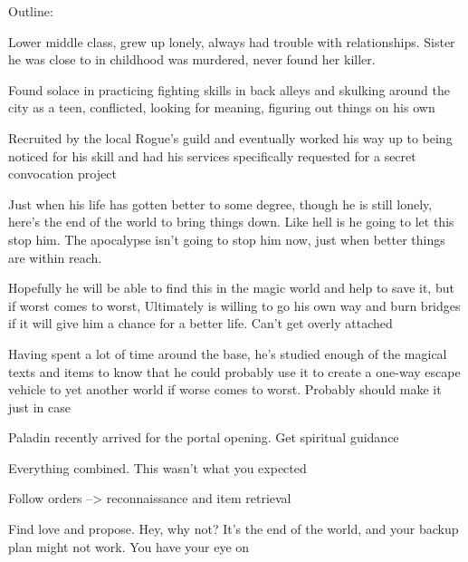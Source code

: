 \documentclass[char]{guildcamp3}
\begin{document}
\name{\cRogueOne{}}

\updatemacro{\cNPC}{
  \unknownplayer %
  }




Outline:

Lower middle class, grew up lonely, always had trouble with relationships. Sister he was close to in childhood was murdered, never found her killer.

Found solace in practicing fighting skills in back alleys and skulking around the city as a teen, conflicted, looking for meaning, figuring out things on his own

Recruited by the local Rogue's guild and eventually worked his way up to being noticed for his skill and had his services specifically requested for a secret convocation project

Just when his life has gotten better to some degree, though he is still lonely, here's the end of the world to bring things down. Like hell is he going to let this stop him. The apocalypse isn't going to stop him now, just when better things are within reach. 

Hopefully he will be able to find this in the magic world and help to save it, but if worst comes to worst, Ultimately is willing to go his own way and burn bridges if it will give him a chance for a better life. Can't get overly attached

Having spent a lot of time around the base, he's studied enough of the magical texts and items to know that he could probably use it to create a one-way escape vehicle to yet another world if worse comes to worst. Probably should make it just in case

Paladin recently arrived for the portal opening. Get spiritual guidance

Everything combined. This wasn't what you expected

Follow orders --> reconnaissance and item retrieval

Find love and propose. Hey, why not? It's the end of the world, and your backup plan might not work. You have your eye on \cPoliOne{}
\end{document}

